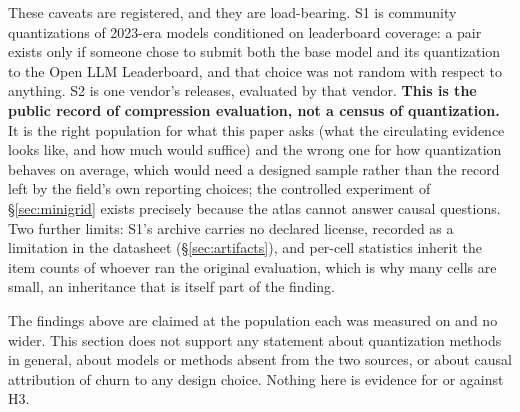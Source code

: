 These caveats are registered, and they are load-bearing. S1 is community
quantizations of 2023-era models conditioned on leaderboard coverage: a pair
exists only if someone chose to submit both the base model and its quantization
to the Open LLM Leaderboard, and that choice was not random with respect to
anything. S2 is one vendor's releases, evaluated by that vendor.
\textbf{This is the public record of compression evaluation, not a census of
quantization.} It is the right population for what this paper asks (what the
circulating evidence looks like, and how much would suffice) and the wrong one
for how quantization behaves on average, which would need a designed sample
rather than the record left by the field's own reporting choices; the controlled
experiment of \S\ref{sec:minigrid} exists precisely because the atlas cannot
answer causal questions. Two further limits: S1's archive carries no
declared license, recorded as a limitation in the datasheet
(\S\ref{sec:artifacts}), and per-cell statistics inherit the item counts of
whoever ran the original evaluation, which is why many cells are small, an
inheritance that is itself part of the finding.

The findings above are claimed at the population each was measured on and no
wider. This section does not support any statement about quantization methods in
general, about models or methods absent from the two sources, or about causal
attribution of churn to any design choice. Nothing here is evidence for or
against H3.
